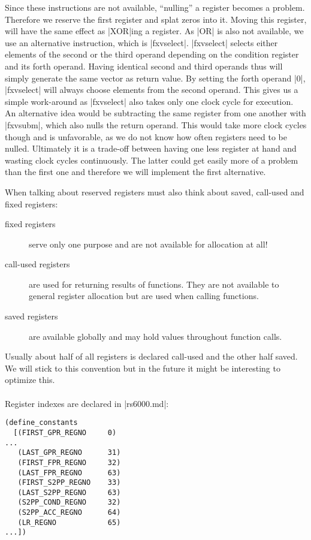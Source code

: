 Since these instructions are not available, ``nulling'' a register becomes a problem.
Therefore we reserve the first register and splat zeros into it.
Moving this register, will have the same effect as |XOR|ing a register.
As |OR| is also not available, we use an alternative instruction, which is |fxvselect|.
|fxvselect| selects either elements of the second or the third operand depending on the condition register and its forth operand\citep{nux}.
Having identical second and third operands thus will simply generate the same vector as return value.
By setting the forth operand |0|, |fxvselect| will always choose elements from the second operand.
This gives us a simple work-around as |fxvselect| also takes only one clock cycle for execution.
An alternative idea would be subtracting the same register from one another with |fxvsubm|, which also nulls the return operand.
This would take more clock cycles though and is unfavorable, as we do not know how often registers need to be nulled.
Ultimately it is a trade-off between having one less register at hand and wasting clock cycles continuously.
The latter could get easily more of a problem than the first one and therefore we will implement the first alternative.

When talking about reserved registers must also think about saved, call-used and fixed registers:
\begin{description}
    \item[fixed registers] serve only one purpose and are not available for allocation at all!
    \item[call-used registers] are used for returning results of functions. They are not available to general register allocation but are used when calling functions.
    \item[saved registers] are available globally and may hold values throughout function calls.
\end{description}

Usually about half of all registers is declared call-used and the other half saved.
We will stick to this convention but in the future it might be interesting to optimize this.
\\
\\
Register indexes are declared in |rs6000.md|:
\begin{lstlisting}
(define_constants
  [(FIRST_GPR_REGNO     0)
...
   (LAST_GPR_REGNO      31)
   (FIRST_FPR_REGNO     32)
   (LAST_FPR_REGNO      63)
   (FIRST_S2PP_REGNO    33)
   (LAST_S2PP_REGNO     63)
   (S2PP_COND_REGNO     32)
   (S2PP_ACC_REGNO      64)
   (LR_REGNO            65)
...])
\end{lstlisting}

